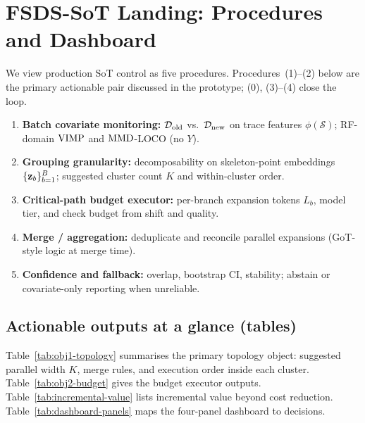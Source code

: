 
\section{FSDS-SoT Landing: Procedures and Dashboard}
\label{sec:sot-landing}

We view production SoT control as five procedures. Procedures~(1)--(2) below
are the primary actionable pair discussed in the prototype; (0), (3)--(4) close
the loop.

\begin{enumerate}[leftmargin=*]
  \item[\textbf{(0)}] \textbf{Batch covariate monitoring:} $\mathcal{D}_{\mathrm{old}}$ vs.\ $\mathcal{D}_{\mathrm{new}}$ on
  trace features $\phi(\mathcal{S})$; RF-domain $\mathrm{VIMP}$ and $\mathrm{MMD}$-LOCO (no $Y$).
  \item[\textbf{(1)}] \textbf{Grouping granularity:} decomposability on skeleton-point
  embeddings $\{\mathbf{z}_b\}_{b=1}^B$; suggested cluster count $K$ and within-cluster order.
  \item[\textbf{(2)}] \textbf{Critical-path budget executor:} per-branch expansion
  tokens $L_b$, model tier, and check budget from shift and quality.
  \item[\textbf{(3)}] \textbf{Merge / aggregation:} deduplicate and reconcile parallel
  expansions (GoT-style logic at merge time).
  \item[\textbf{(4)}] \textbf{Confidence and fallback:} overlap, bootstrap CI, stability;
  abstain or covariate-only reporting when unreliable.
\end{enumerate}

\subsection{Actionable outputs at a glance (tables)}
\label{sec:action-tables}

Table~\ref{tab:obj1-topology} summarises the primary topology object: suggested
parallel width $K$, merge rules, and execution order inside each cluster.
Table~\ref{tab:obj2-budget} gives the budget executor outputs.
Table~\ref{tab:incremental-value} lists incremental value beyond cost reduction.
Table~\ref{tab:dashboard-panels} maps the four-panel dashboard to decisions.

